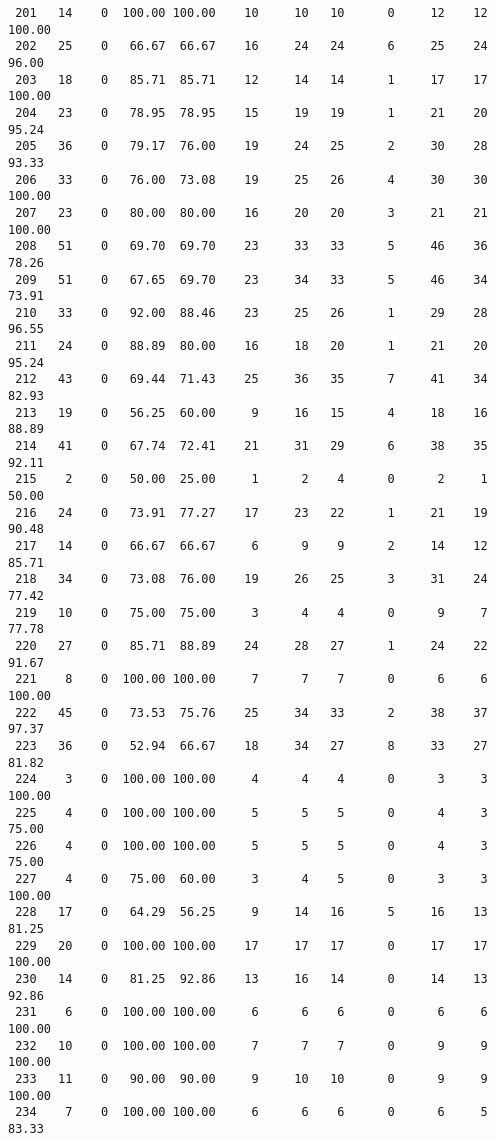 \begin{verbatim}
 201   14    0  100.00 100.00    10     10   10      0     12    12   100.00
 202   25    0   66.67  66.67    16     24   24      6     25    24    96.00
 203   18    0   85.71  85.71    12     14   14      1     17    17   100.00
 204   23    0   78.95  78.95    15     19   19      1     21    20    95.24
 205   36    0   79.17  76.00    19     24   25      2     30    28    93.33
 206   33    0   76.00  73.08    19     25   26      4     30    30   100.00
 207   23    0   80.00  80.00    16     20   20      3     21    21   100.00
 208   51    0   69.70  69.70    23     33   33      5     46    36    78.26
 209   51    0   67.65  69.70    23     34   33      5     46    34    73.91
 210   33    0   92.00  88.46    23     25   26      1     29    28    96.55
 211   24    0   88.89  80.00    16     18   20      1     21    20    95.24
 212   43    0   69.44  71.43    25     36   35      7     41    34    82.93
 213   19    0   56.25  60.00     9     16   15      4     18    16    88.89
 214   41    0   67.74  72.41    21     31   29      6     38    35    92.11
 215    2    0   50.00  25.00     1      2    4      0      2     1    50.00
 216   24    0   73.91  77.27    17     23   22      1     21    19    90.48
 217   14    0   66.67  66.67     6      9    9      2     14    12    85.71
 218   34    0   73.08  76.00    19     26   25      3     31    24    77.42
 219   10    0   75.00  75.00     3      4    4      0      9     7    77.78
 220   27    0   85.71  88.89    24     28   27      1     24    22    91.67
 221    8    0  100.00 100.00     7      7    7      0      6     6   100.00
 222   45    0   73.53  75.76    25     34   33      2     38    37    97.37
 223   36    0   52.94  66.67    18     34   27      8     33    27    81.82
 224    3    0  100.00 100.00     4      4    4      0      3     3   100.00
 225    4    0  100.00 100.00     5      5    5      0      4     3    75.00
 226    4    0  100.00 100.00     5      5    5      0      4     3    75.00
 227    4    0   75.00  60.00     3      4    5      0      3     3   100.00
 228   17    0   64.29  56.25     9     14   16      5     16    13    81.25
 229   20    0  100.00 100.00    17     17   17      0     17    17   100.00
 230   14    0   81.25  92.86    13     16   14      0     14    13    92.86
 231    6    0  100.00 100.00     6      6    6      0      6     6   100.00
 232   10    0  100.00 100.00     7      7    7      0      9     9   100.00
 233   11    0   90.00  90.00     9     10   10      0      9     9   100.00
 234    7    0  100.00 100.00     6      6    6      0      6     5    83.33

\end{verbatim}
